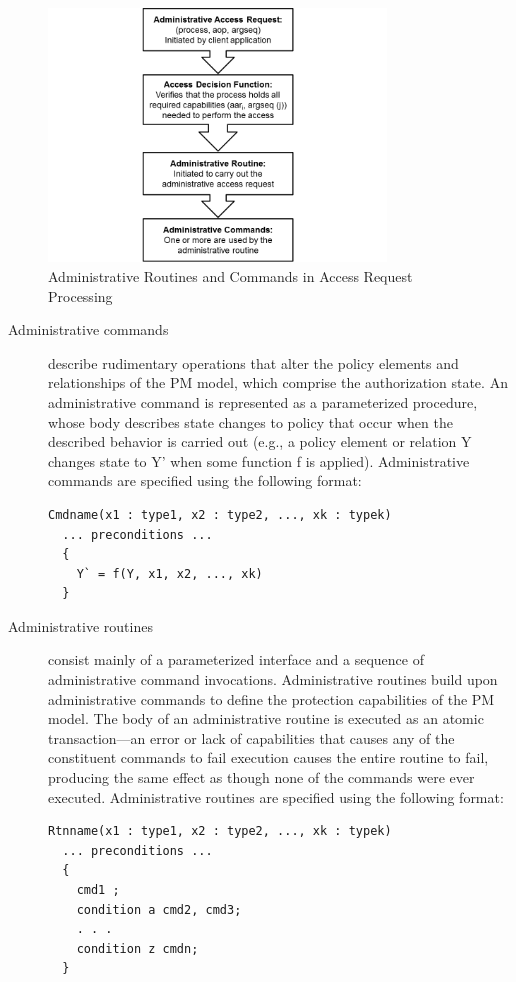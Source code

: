 \documentclass[12pt,a4paper,titlepage]{book}
\begin{document}
	\begin{figure}[h]
		\centering
		\includegraphics[width = 0.8\textwidth]{images/AdministrativeRoutinesCommandsAccessRequestProcessing.png}
		\caption{Administrative Routines and Commands in Access Request Processing}
		\label{fig:AdministrativeRoutinesCommandsAccessRequestProcessing}
	\end{figure}
	
	\begin{description}
		
		\item[Administrative commands] describe rudimentary operations that alter the policy elements and relationships of the PM model, which comprise the authorization state. An administrative command is represented as a parameterized procedure, whose body describes state changes to policy that occur when the described behavior is carried out (e.g., a policy element or relation Y changes state to Y' when some function f is applied). Administrative commands are specified using the following format:
		\begin{lstlisting}
Cmdname(x1 : type1, x2 : type2, ..., xk : typek)
  ... preconditions ...
  {
    Y` = f(Y, x1, x2, ..., xk)
  }\end{lstlisting}
		
		\item[Administrative routines] consist mainly of a parameterized interface and a  sequence of  administrative command invocations. Administrative routines build upon administrative commands to define the protection capabilities of the PM model. The body of an administrative routine is executed as an atomic transaction—an error or lack of capabilities that causes any of the constituent commands to fail execution causes the entire routine to fail, producing the same effect as though none of the commands were ever executed. Administrative routines are specified using the following format:
		\begin{lstlisting}
Rtnname(x1 : type1, x2 : type2, ..., xk : typek)
  ... preconditions ...
  {
    cmd1 ;
    condition a cmd2, cmd3;
    . . .
    condition z cmdn;
  }\end{lstlisting}

	\end{description}
\end{document}
